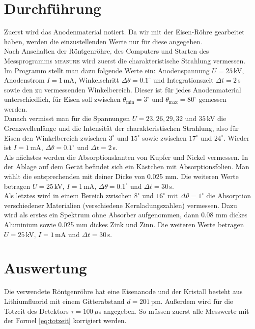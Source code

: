 \documentclass[12pt,a4paper,titlepage,headinclude,bibtotoc]{scrartcl}
\begin{document}
\section{Durchführung}
\label{sec:durchfuehrung}
Zuerst wird das Anodenmaterial notiert.
Da wir mit der Eisen-Röhre gearbeitet haben, werden die einzustellenden Werte nur für diese angegeben.\\
Nach Anschalten der Röntgenröhre, des Computers und Starten des Messprogramms \textsc{measure} wird zuerst die charakteristische Strahlung vermessen.
Im Programm stellt man dazu folgende Werte ein: Anodenspannung $U=25\,$kV, Anodenstrom $I=1\,$mA, Winkelschritt $\Delta\theta=0.1^\circ$ und Integrationszeit $\Delta t=2\,$s sowie den zu vermessenden Winkelbereich.
Dieser ist für jedes Anodenmaterial unterschiedlich, für Eisen soll zwischen $\theta_\text{min}=3^\circ$ und $\theta_\text{max}=80^\circ$ gemessen werden.\\
Danach vermisst man für die Spannungen $U=23, 26, 29, 32 \text{ und } 35\,$kV die Grenzwellenlänge und die Intensität der charakteristischen Strahlung, also für Eisen den Winkelbereich zwischen $3^\circ$ und $15^\circ$ sowie zwischen $17^\circ$ und $24^\circ$.
Wieder ist $I=1\,$mA, $\Delta\theta=0.1^\circ$ und $\Delta t=2\,$s.\\
Als nächstes werden die Absorptionskanten von Kupfer und Nickel vermessen.
In der Ablage auf dem Gerät befindet sich ein Kästchen mit Absorptionsfolien.
Man wählt die entsprechenden mit deiner Dicke von 0.025 mm.
Die weiteren Werte betragen $U=25\,$kV, $I=1\,$mA, $\Delta\theta=0.1^\circ$ und $\Delta t=30\,$s.\\
Als letztes wird in einem Bereich zwischen $8^\circ$ und $16^\circ$ mit $\Delta\theta=1^\circ$ die Absorption verschiedener Materialien (verschiedene Kernladungszahlen) vermessen.
Dazu wird als erstes ein Spektrum ohne Absorber aufgenommen, dann 0.08 mm dickes Aluminium sowie 0.025 mm dickes Zink und Zinn.
Die weiteren Werte betragen $U=25\,$kV, $I=1\,$mA und $\Delta t=30\,$s.
\newpage

\section{Auswertung}
\label{sec:auswertung}
Die verwendete Röntgenröhre hat eine Eisenanode und der Kristall besteht aus Lithiumfluorid mit einem Gitterabstand $d=201\,$pm.
Außerdem wird für die Totzeit des Detektors $\tau=100\,\mu$s angegeben.
So müssen zuerst alle Messwerte mit der Formel \eqref{eq:totzeit} korrigiert werden.
\end{document}
